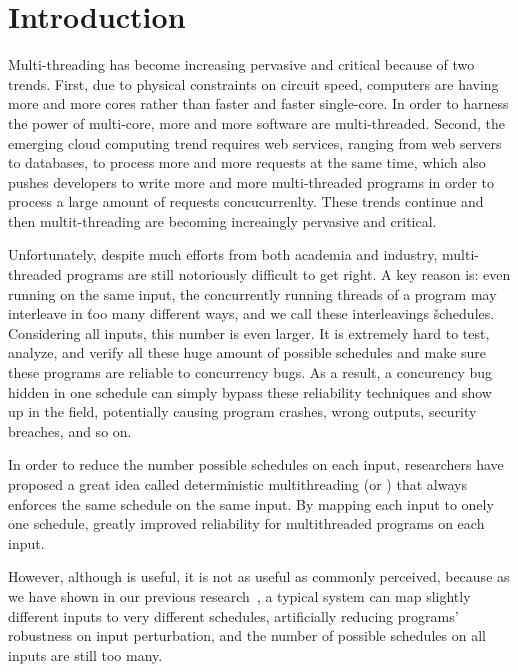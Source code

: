 \section{Introduction} \label{ch:intro}

Multi-threading has become increasing pervasive and critical because of two 
trends. First, due to physical constraints on circuit speed, computers are having
more and more cores rather than faster and faster single-core. In order to 
harness the power of multi-core, more and more software are multi-threaded. 
Second, the emerging cloud computing trend requires web services, ranging from 
web servers to databases, to process more and more requests at the same time, which also 
pushes developers to write more and more multi-threaded programs in order to 
process a large amount of requests concucurrenlty. These trends continue and 
then multit-threading are becoming increaingly pervasive and critical.

Unfortunately, despite much efforts from both academia and industry, 
multi-threaded programs are still notoriously difficult to get right. A key 
reason is: even running on the same input, the concurrently running threads of 
a program may interleave in \v{too many} different ways, and we call these interleavings 
\v{schedules}. Considering all inputs, this number is even larger. 
It is extremely hard to test, analyze, and verify all these huge 
amount of possible schedules and make sure these programs are reliable to 
concurrency bugs. As a result, a concurency bug hidden in one schedule can 
simply bypass these reliability techniques and show up in the field, 
potentially causing program crashes, wrong outputs, security breaches, and so on.

In order to reduce the number possible schedules on each input, researchers 
have proposed a great idea called deterministic multithreading (or \dmt) that 
always enforces the same schedule on the same input. By mapping each input to onely 
one schedule, \dmt greatly improved reliability for multithreaded programs on each input.

However, although \dmt is useful, it is not as useful as commonly perceived, 
because as we have shown in our previous research~\cite{cui:tern:osdi10},
a typical \dmt system can map slightly different inputs to 
very different schedules, artificially reducing programs' robustness on input 
perturbation, and the number of possible schedules on all inputs are still too 
many.

